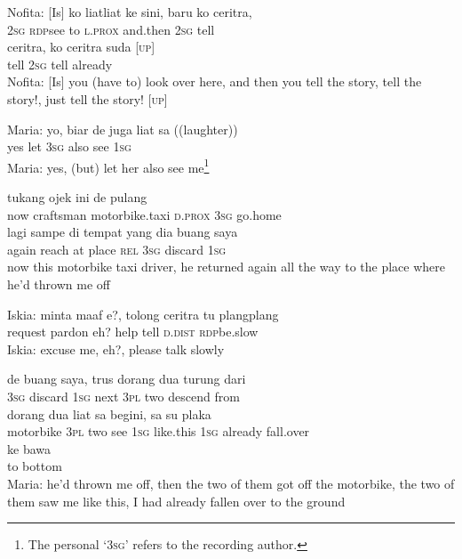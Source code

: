 \ea
\gll   Nofita:   [Is]    {ko}    {liat{\Tilde}liat}    {ke}   sini,   baru   ko   ceritra,\\
   {}   {}   {\textsc{2sg}}    {\textsc{rdp}{\Tilde}see}    {to}   \textsc{l.prox}   and.then   \textsc{2sg}   tell\\
\gll ceritra,    {ko}    {ceritra}    {suda}    {\upshape\textsc{[up]}}\\
  tell    {\textsc{2sg}}    {tell}    {already}    {}\\
\glt
Nofita: [Is] you (have to) look over here, and then you tell the story, tell the story!, just tell the story! [\textsc{up}]
\z

\ea
\gll   Maria:   yo,   biar   de   juga   liat   sa   ((laughter))\\
 {} yes   let   \textsc{3sg}   also   see   \textsc{1sg}   \\
\glt
Maria: yes, (but) let her also see me\footnote{The personal   ‘\textsc{3sg}’ refers to the recording author.}
\z

\ea
{}    {tukang}    {ojek}    {ini}    {de}   pulang\\
   {now}    {craftsman}    {motorbike.taxi}    {\textsc{d.prox}}    {\textsc{3sg}}   go.home\\
\gll lagi    {sampe}   di    {tempat}   yang    {dia}    {buang}    {saya}\\
  again    {reach}   at    {place}   \textsc{rel}    {\textsc{3sg}}    {discard}    {\textsc{1sg}}\\
\glt
now this motorbike taxi driver, he returned again all the way to the place where he’d thrown me off
\z

\ea
\gll   Iskia:   minta   maaf   e?,   tolong   ceritra   tu   plang{\Tilde}plang\\
 {} request   pardon   eh?   help   tell   \textsc{d.dist}   \textsc{rdp}{\Tilde}be.slow\\
\glt
Iskia: excuse me, eh?, please talk slowly
\z

\ea
{}    {de}    {buang}    {saya,}    {trus}    {dorang}    {dua}    {turung}    {dari}\\
   {}    {\textsc{3sg}}    {discard}    {\textsc{1sg}}    {next}    {\textsc{3pl}}    {two}    {descend}    {from}\\
    {dorang}    {dua}    {liat}    {sa}    {begini,}    {sa}    {su}   plaka\\
   {motorbike}    {\textsc{3pl}}    {two}    {see}    {\textsc{1sg}}    {like.this}    {\textsc{1sg}}    {already}   fall.over\\
\gll  ke    {bawa}\\
  to    {bottom}\\
\glt
Maria: he’d thrown me off, then the two of them got off the motorbike, the two of them saw me like this, I had already fallen over to the ground
\z

